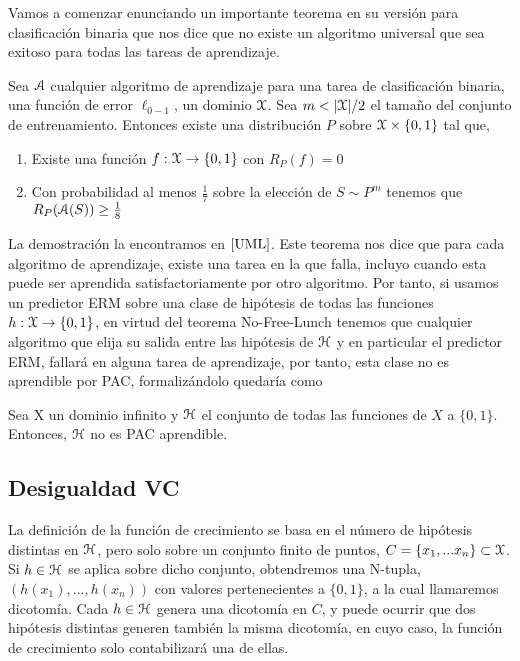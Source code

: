     Vamos a comenzar enunciando un importante teorema en su versión para clasificación binaria que nos dice que no existe un algoritmo universal que sea exitoso para todas las tareas de aprendizaje. 
    
    \begin{teorema}
    Sea $\mathcal{A}$ cualquier algoritmo de aprendizaje para una tarea de clasificación binaria, una función de error $\ell_{0-1}$, un dominio $\mathcal{X}$. Sea $m < |\mathcal{X}|/2$ el tamaño del conjunto de entrenamiento. Entonces existe una distribución $P$ sobre $\mathcal{X}\times\{0,1\}$ tal que,
    \begin{enumerate}
        \item Existe una función $f:\mathcal{X} \to \{0,1\}$ con $R_{P}(f) = 0$
        \item Con probabilidad al menos $\frac{1}{7}$ sobre la elección de $S\sim P^m$ tenemos que $R_{P}(\mathcal{A}(S)) \geq \frac{1}{8}$
    \end{enumerate}
    \end{teorema}
    
    La demostración la encontramos en $\cite{UML}$. Este teorema nos dice que para cada algoritmo de aprendizaje, existe una tarea en la que falla, incluyo cuando esta puede ser aprendida satisfactoriamente por otro algoritmo. Por tanto, si usamos un predictor ERM sobre una clase de hipótesis de todas las funciones $h:\mathcal{X} \to \{0,1\}$, en virtud del teorema No-Free-Lunch tenemos que cualquier algoritmo que elija su salida entre las hipótesis de $\mathcal{H}$ y en particular el predictor ERM, fallará en alguna tarea de aprendizaje, por tanto, esta clase no es aprendible por PAC, formalizándolo quedaría como \\
    
    \begin{corolario}
    Sea X un dominio infinito y $\mathcal{H}$ el conjunto de todas las funciones de $X$ a $\{0,1\}$. Entonces, $\mathcal{H}$ no es PAC aprendible.
    \end{corolario}

\subsection{Desigualdad VC}
    
    La definición de la función de crecimiento se basa en el número de hipótesis distintas en $\mathcal{H}$, pero solo sobre un conjunto finito de puntos, $C = \{x_1,...x_n\} \subset \mathcal{X}$. Si $h \in \mathcal{H}$ se aplica sobre dicho conjunto, obtendremos una N-tupla, $(h(x_1),...,h(x_n))$ con valores pertenecientes a $\{0,1\}$, a la cual llamaremos dicotomía. Cada $h \in \mathcal{H}$ genera una dicotomía en $C$, y puede ocurrir que dos hipótesis distintas generen también la misma dicotomía, en cuyo caso, la función de crecimiento solo contabilizará una de ellas. \\
    
